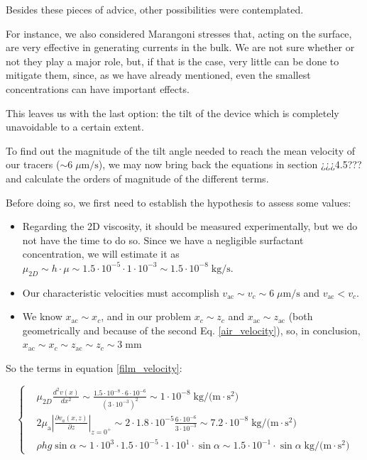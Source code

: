 Besides these pieces of advice, other possibilities were contemplated.

For instance, we also considered Marangoni stresses that, acting on the surface, are very effective in generating currents in the bulk. We are not sure whether or not they play a major role, but, if that is the case, very little can be done to mitigate them, since, as we have already mentioned, even the smallest concentrations can have important effects.

This leaves us with the last option: the tilt of the device which is completely unavoidable to a certain extent.

To find out the magnitude of the tilt angle needed to reach the mean velocity of our tracers ($\sim 6 \; \mu \textrm{m/s}$), we may now bring back the equations in section ¿¿¿4.5??? and calculate the orders of magnitude of the different terms. 

Before doing so, we first need to establish the hypothesis to assess some values:

\begin{itemize}
	\item Regarding the 2D viscosity, it should be measured experimentally, but we do not have the time to do so. Since we have a negligible surfactant concentration, we will estimate it as $\mu_{2D} \sim h \cdot \mu \sim 1.5\cdot 10^{-5} \cdot 1\cdot 10^{-3} \sim 1.5\cdot 10^{-8} \; \textrm{kg/s}$.
	\item Our characteristic velocities must accomplish $ v_{\mathrm{ac}} \sim v_c \sim 6 \; \mu \textrm{m/s}$ and $ v_{\mathrm{ac}} < v_c $.
	\item We know $x_{\mathrm{ac}} \sim x_c$, and in our problem $ x_c \sim z_c $ and $ x_{\mathrm{ac}} \sim z_{\mathrm{ac}} $ (both geometrically and because of the second Eq. \ref{air_velocity}), so, in conclusion, $ x_{\mathrm{ac}} \sim x_c \sim z_{\mathrm{ac}} \sim z_c \sim 3 \; \textrm{mm}$
	
\end{itemize}

So the terms in equation \ref{film_velocity}:

\begin{equation}
\left\{
\begin{aligned}
& \mu_{2D} \frac{d^{2} v(x)}{d x^{2}} \sim \frac{1.5\cdot 10^{-8} \cdot 6\cdot 10^{-6}}{(3\cdot 10^{-3})^2} \sim 1\cdot 10^{-8} \; \textrm{kg/(m} \cdot \textrm{s}^\textrm{2} \textrm{)}\\
& 2 \mu_{\mathrm{a}}\left|\frac{\partial v_{a}(x, z)}{\partial z}\right|_{z=0^{+}} \sim 2 \cdot 1.8\cdot 10^{-5} \frac{6\cdot 10^{-6}}{3\cdot 10^{-3}} \sim 7.2\cdot 10^{-8} \; \textrm{kg/(m} \cdot \textrm{s}^\textrm{2} \textrm{)}\\
& \rho h g \sin \alpha \sim 1\cdot 10^{3} \cdot 1.5\cdot 10^{-5} \cdot 1\cdot 10^{1} \cdot \sin \alpha \sim 1.5\cdot 10^{-1} \cdot \sin \alpha \; \textrm{kg/(m} \cdot \textrm{s}^\textrm{2} \textrm{)} 
\end{aligned}
\right.
\end{equation}


